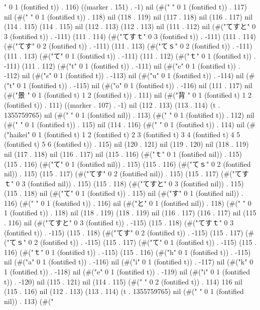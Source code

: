 " 0 1 (fontified t)) . 116) ((marker . 151) . -1) nil (#("
" 0 1 (fontified t)) . 117) nil (#("
" 0 1 (fontified t)) . 118) nil (118 . 119) nil (117 . 118) nil (116 . 117) nil (114 . 115) (114 . 115) nil (112 . 113) (112 . 113) nil (111 . 112) nil (#("てすと" 0 3 (fontified t)) . -111) (111 . 114) (#("てすｔ" 0 3 (fontified t)) . -111) (111 . 114) (#("てす" 0 2 (fontified t)) . -111) (111 . 113) (#("てｓ" 0 2 (fontified t)) . -111) (111 . 113) (#("て" 0 1 (fontified t)) . -111) (111 . 112) (#("ｔ" 0 1 (fontified t)) . -111) (111 . 112) (#("t" 0 1 (fontified t)) . -111) nil (#("e" 0 1 (fontified t)) . -112) nil (#("s" 0 1 (fontified t)) . -113) nil (#("u" 0 1 (fontified t)) . -114) nil (#("t" 0 1 (fontified t)) . -115) nil (#("o" 0 1 (fontified t)) . -116) nil (111 . 117) nil (#("景
" 0 1 (fontified t) 1 2 (fontified t)) . 111) nil (#("背
" 0 1 (fontified t) 1 2 (fontified t)) . 111) ((marker . 107) . -1) nil (112 . 113) (113 . 114) (t . 1355759765) nil (#(" " 0 1 (fontified nil)) . 113) (#("
" 0 1 (fontified t)) . 112) nil (#(" " 0 1 (fontified t)) . 115) nil (114 . 116) (#("
" 0 1 (fontified t)) . 114) nil (#("haikei" 0 1 (fontified t) 1 2 (fontified t) 2 3 (fontified t) 3 4 (fontified t) 4 5 (fontified t) 5 6 (fontified t)) . 115) nil (120 . 121) nil (119 . 120) nil (118 . 119) nil (117 . 118) nil (116 . 117) nil (115 . 116) (#("ｔ" 0 1 (fontified nil)) . 115) (115 . 116) (#("て" 0 1 (fontified nil)) . 115) (115 . 116) (#("てｓ" 0 2 (fontified nil)) . 115) (115 . 117) (#("てす" 0 2 (fontified nil)) . 115) (115 . 117) (#("てすｔ" 0 3 (fontified nil)) . 115) (115 . 118) (#("てすと" 0 3 (fontified nil)) . 115) (115 . 118) nil (#("て" 0 1 (fontified t)) . 115) nil (#("す" 0 1 (fontified nil)) . 116) (#("
" 0 1 (fontified t)) . 116) nil (#("と" 0 1 (fontified nil)) . 118) (#("
" 0 1 (fontified t)) . 118) nil (118 . 119) (118 . 119) nil (116 . 117) (116 . 117) nil (115 . 116) nil (#("てすと" 0 3 (fontified t)) . -115) (115 . 118) (#("てすｔ" 0 3 (fontified t)) . -115) (115 . 118) (#("てす" 0 2 (fontified t)) . -115) (115 . 117) (#("てｓ" 0 2 (fontified t)) . -115) (115 . 117) (#("て" 0 1 (fontified t)) . -115) (115 . 116) (#("ｔ" 0 1 (fontified t)) . -115) (115 . 116) (#("h" 0 1 (fontified t)) . -115) nil (#("a" 0 1 (fontified t)) . -116) nil (#("i" 0 1 (fontified t)) . -117) nil (#("k" 0 1 (fontified t)) . -118) nil (#("e" 0 1 (fontified t)) . -119) nil (#("i" 0 1 (fontified t)) . -120) nil (115 . 121) nil (114 . 115) (#("  " 0 2 (fontified t)) . 114) 116 nil (115 . 116) nil (112 . 113) (113 . 114) (t . 1355759765) nil (#("
" 0 1 (fontified nil)) . 113) (#("
